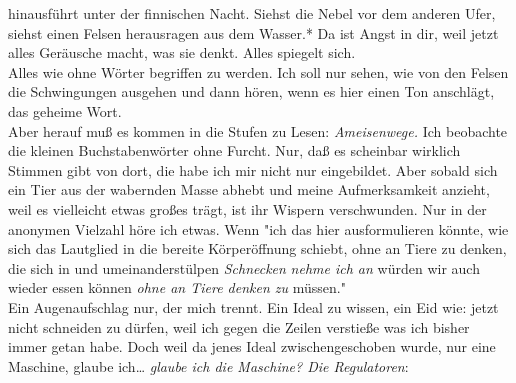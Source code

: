 \documentclass[
]{article}
\begin{document}
hinausführt unter der finnischen Nacht. Siehst die Nebel vor dem anderen
Ufer, siehst einen Felsen herausragen aus dem Wasser.* Da ist Angst in
dir, weil jetzt alles Geräusche macht, was sie denkt. Alles spiegelt
sich.\\
Alles wie ohne Wörter begriffen zu werden. Ich soll nur sehen, wie von
den Felsen die Schwingungen ausgehen und dann hören, wenn es hier einen
Ton anschlägt, das geheime Wort.\\
Aber herauf muß es kommen in die Stufen zu Lesen: \emph{Ameisenwege.}
Ich beobachte die kleinen Buchstabenwörter ohne Furcht. Nur, daß es
scheinbar wirklich Stimmen gibt von dort, die habe ich mir nicht nur
eingebildet. Aber sobald sich ein Tier aus der wabernden Masse abhebt
und meine Aufmerksamkeit anzieht, weil es vielleicht etwas großes trägt,
ist ihr Wispern verschwunden. Nur in der anonymen Vielzahl höre ich
etwas. Wenn "ich das hier ausformulieren könnte, wie sich das Lautglied
in die bereite Körperöffnung schiebt, ohne an Tiere zu denken, die sich
in und umeinanderstülpen \emph{Schnecken} \emph{nehme ich an} würden wir
auch wieder essen können \emph{ohne an Tiere denken zu }müssen."\\
Ein Augenaufschlag nur, der mich trennt. Ein Ideal zu wissen, ein Eid
wie: jetzt nicht schneiden zu dürfen, weil ich gegen die Zeilen
verstieße was ich bisher immer getan habe. Doch weil da jenes Ideal
zwischengeschoben wurde, nur eine Maschine, glaube ich\ldots{}
\emph{glaube ich die Maschine? Die Regulatoren}:
\end{document}

